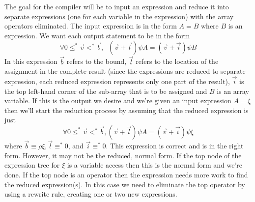 The goal for the compiler will be to input an expression and reduce it into
separate expressions (one for each variable in the expression) with the
array operators eliminated.  The input expression is in the form
$A=B$ where $B$ is an expression.
We want each output statement to be in the
form
$$\forall 0\leq^{*}\vec{v}<^{*}\vec{b}, \;\;(\vec{v}+\vec{l})\psi A=
(\vec{v}+\vec{i})\psi B$$
In this expression $\vec{b}$ refers to the bound, $\vec{l}$ refers to the
location of the assignment in the complete result (since the expressions 
are reduced to separate expression, each reduced expression represents only
one part of the result), $\vec{i}$ is the top left-hand corner of the
sub-array that is to be assigned and $B$ is an array variable.  
If this is the output we desire and
we're given an input expression $A=\xi$ then we'll start the reduction process
by assuming that the reduced expression is just
$$\forall 0\leq^{*}\vec{v}<^{*}\vec{b}, (\vec{v}+\vec{l})\psi A=
(\vec{v}+\vec{i})\psi \xi$$ where $\vec{b}\equiv\rho\xi, \vec{l}\equiv^{*}0$,
and $\vec{i}\equiv^{*}0$.  This expression is correct and is
in the right form.  However, it may not be the reduced, normal form.  If the 
top node of the expression tree for $\xi$ is a variable access then this is 
the normal form and we're done.  If the top node is an operator then the
expression needs more work to find the reduced expression(s).  In this
case we need to eliminate the top operator by using a rewrite rule,
creating one or two new expressions.
 
